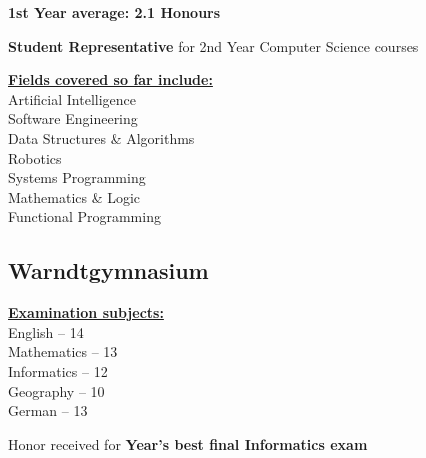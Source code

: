 \documentclass[]{jonas-cv}
\begin{document}
\begin{minipage}[t]{0.33\textwidth}
\begin{tightemize}
    \item \textbf{1st Year average: 2.1 Honours}
    \item \textbf{Student Representative} for 2nd Year Computer Science courses
    \item \textbf{\underline{Fields covered so far include:}}\\
    Artificial Intelligence \\
    Software Engineering \\
    Data Structures \& Algorithms \\
    Robotics \\
    Systems Programming \\
    Mathematics \& Logic \\
    Functional Programming
\end{tightemize}
\largesectionsep


\subsection{Warndtgymnasium}

\begin{tightemize}
    \item \textbf{\underline{Examination subjects:}}\\
             English -- 14 \\
             Mathematics -- 13\\
             Informatics -- 12\\
             Geography -- 10\\
             German -- 13
    \item Honor received for \textbf{Year's best final Informatics exam}
\end{tightemize}
\largesectionsep
\vspace{-0.5mm}

%
%

\end{minipage} 
\hspace{1.5mm}
\vrule %
\hspace{1.5mm}
\end{document}
